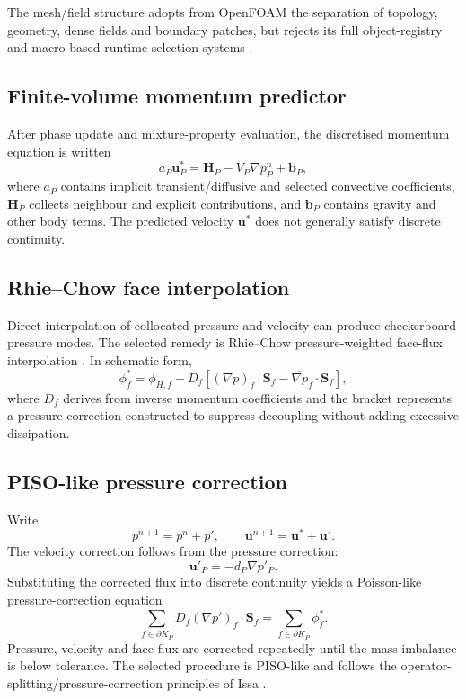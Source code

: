 \documentclass[11pt,a4paper]{article}
\newcommand{\vect}[1]{\bm{#1}}
\newcommand{\grad}{\nabla}
\begin{document}
The mesh/field structure adopts from OpenFOAM the separation of topology, geometry, dense fields and boundary patches, but rejects its full object-registry and macro-based runtime-selection systems \cite{openfoamReview}.

\subsection{Finite-volume momentum predictor}

After phase update and mixture-property evaluation, the discretised momentum equation is written
\begin{equation}
  a_P\vect u_P^*
  =\vect H_P- V_P\grad p^n_P+\vect b_P,
  \label{eq:mompredict}
\end{equation}
where $a_P$ contains implicit transient/diffusive and selected convective coefficients, $\vect H_P$ collects neighbour and explicit contributions, and $\vect b_P$ contains gravity and other body terms. The predicted velocity $\vect u^*$ does not generally satisfy discrete continuity.

\subsection{Rhie--Chow face interpolation}

Direct interpolation of collocated pressure and velocity can produce checkerboard pressure modes. The selected remedy is Rhie--Chow pressure-weighted face-flux interpolation \cite{rhieChow1983}. In schematic form,
\begin{equation}
  \phi_f^*=\phi_{H,f}
  -D_f\left[(\grad p)_f\cdot\vect S_f
  -\overline{\grad p}_f\cdot\vect S_f\right],
  \label{eq:rhie}
\end{equation}
where $D_f$ derives from inverse momentum coefficients and the bracket represents a pressure correction constructed to suppress decoupling without adding excessive dissipation.

\subsection{PISO-like pressure correction}

Write
\begin{equation}
  p^{n+1}=p^n+p',
  \qquad
  \vect u^{n+1}=\vect u^*+\vect u'.
\end{equation}
The velocity correction follows from the pressure correction:
\begin{equation}
  \vect u'_P=-d_P\grad p'_P.
\end{equation}
Substituting the corrected flux into discrete continuity yields a Poisson-like pressure-correction equation
\begin{equation}
  \sum_{f\in\partial K_P}D_f(\grad p')_f\cdot\vect S_f
  =\sum_{f\in\partial K_P}\phi_f^*.
  \label{eq:pcorr}
\end{equation}
Pressure, velocity and face flux are corrected repeatedly until the mass imbalance is below tolerance. The selected procedure is PISO-like and follows the operator-splitting/pressure-correction principles of Issa \cite{issa1986a,issa1986b}.
\end{document}
